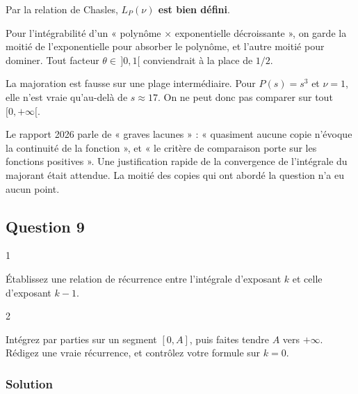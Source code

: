 \documentclass[11pt,a4paper]{article}
\begin{document}
Par la relation de Chasles, \textbf{\(L_P(\nu)\) est bien défini}.

\begin{methode}

Pour l'intégrabilité d'un « polynôme × exponentielle décroissante », on garde la moitié de l'exponentielle pour absorber le polynôme, et l'autre moitié pour dominer. Tout facteur \(\theta\in\,]0,1[\) conviendrait à la place de \(1/2\).

\end{methode}

\begin{piege}

La majoration est fausse sur une plage intermédiaire. Pour \(P(s)=s^3\) et \(\nu=1\), elle n'est vraie qu'au-delà de \(s\approx17\). On ne peut donc pas comparer sur tout \([0,+\infty[\).

\end{piege}

\begin{jury}

Le rapport 2026 parle de « graves lacunes » : « quasiment aucune copie n'évoque la continuité de la fonction », et « le critère de comparaison porte sur les fonctions positives ». Une justification rapide de la convergence de l'intégrale du majorant était attendue. La moitié des copies qui ont abordé la question n'a eu aucun point.

\end{jury}

\hypertarget{question-9}{%
\subsection{Question 9}\label{question-9}}

\begin{indication}{1}

Établissez une relation de récurrence entre l'intégrale d'exposant \(k\) et celle d'exposant \(k-1\).

\end{indication}

\begin{indication}{2}

Intégrez par parties sur un segment \([0,A]\), puis faites tendre \(A\) vers \(+\infty\). Rédigez une vraie récurrence, et contrôlez votre formule sur \(k=0\).

\end{indication}

\hypertarget{solution-10}{%
\subsubsection{Solution}\label{solution-10}}
\end{document}

